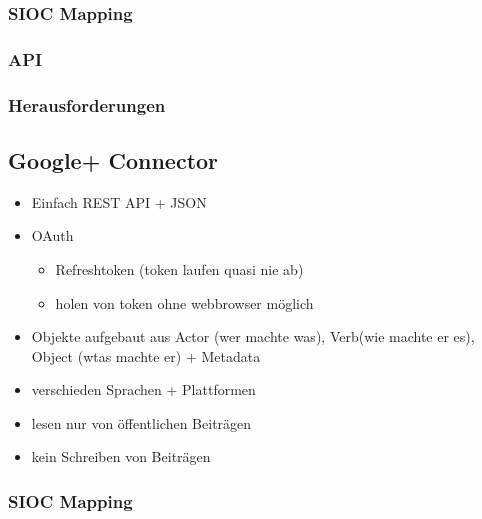 \subsubsection{SIOC Mapping} %
\label{ssub:facebook_sioc_mapping}

\subsubsection{API} %
\label{ssub:facebook_api}

\subsubsection{Herausforderungen} %
\label{ssub:facebook_herausforderungen}





\subsection{Google+ Connector} %
\label{sub:google_plus_connector}

\begin{itemize}
    \item Einfach REST API + JSON
    \item OAuth
    \begin{itemize}
        \item Refreshtoken (token laufen quasi nie ab)
        \item holen von token ohne webbrowser möglich
    \end{itemize}
    \item Objekte aufgebaut aus Actor (wer machte was), Verb(wie machte er es), Object (wtas machte er) + Metadata
    \item verschieden Sprachen + Plattformen
    \item lesen nur von öffentlichen Beiträgen
    \item kein Schreiben von Beiträgen
\end{itemize}

\subsubsection{SIOC Mapping} %
\label{ssub:google_plus_sioc_mapping}

